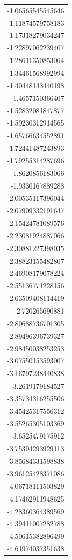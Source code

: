 \documentclass[11pt]{article}
\begin{document}
\begin{center}
\begin{tabular}{r}
-1.06565545545646\\
-1.11874579758183\\
-1.17318279034247\\
-1.22897062239407\\
-1.28611350853064\\
-1.34461568992994\\
-1.40448143440198\\
-1.4657150366407\\
-1.52832081847877\\
-1.59230312914565\\
-1.65766634552891\\
-1.72441487243893\\
-1.79255314287696\\
-1.8620856183066\\
-1.9330167889288\\
-2.00535117396044\\
-2.07909332191647\\
-2.15424781089576\\
-2.23081924887066\\
-2.30881227398035\\
-2.38823155482807\\
-2.46908179078224\\
-2.55136771228156\\
-2.63509408114419\\
-2.720265690881\\
-2.80688736701305\\
-2.89496396739327\\
-2.98450038253253\\
-3.07550153593007\\
-3.16797238440838\\
-3.2619179184527\\
-3.35734316255506\\
-3.45425317556312\\
-3.55265305103369\\
-3.6525479175912\\
-3.75394293929113\\
-3.85684331598838\\
-3.96125428371086\\
-4.06718111503829\\
-4.17462911948625\\
-4.28360364389569\\
-4.39411007282788\\
-4.50615382896499\\
-4.61974037351638\\

\end{tabular}
\end{center}
\end{document}
